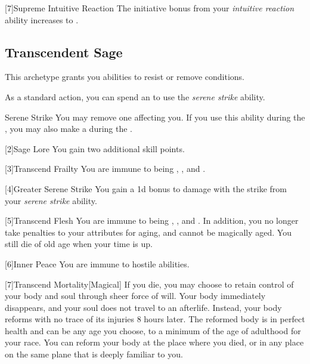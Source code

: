         [7]{Supreme Intuitive Reaction}
        The initiative bonus from your \textit{intuitive reaction} ability increases to .

    \subsection{Transcendent Sage}
        This archetype grants you abilities to resist or remove conditions.

         As a standard action, you can spend an  to use the \textit{serene strike} ability.
        \begin{ability}{Serene Strike}
            You may remove one  affecting you.
            If you use this ability during the , you may also make a  during the .
        \end{ability}

        [2]{Sage Lore} You gain two additional skill points.

        [3]{Transcend Frailty}
        You are immune to being , , and .

        [4]{Greater Serene Strike} You gain a \plus1d bonus to damage with the strike from your \textit{serene strike} ability.

        [5]{Transcend Flesh}
        You are immune to being , , and .
        In addition, you no longer take penalties to your attributes for aging, and cannot be magically aged.
        You still die of old age when your time is up.

        [6]{Inner Peace}
        You are immune to hostile  abilities.

        [7]{Transcend Mortality}[Magical]
        If you die, you may choose to retain control of your body and soul through sheer force of will.
        Your body immediately disappears, and your soul does not travel to an afterlife.
        Instead, your body reforms with no trace of its injuries 8 hours later.
        The reformed body is in perfect health and can be any age you choose, to a minimum of the age of adulthood for your race.
        You can reform your body at the place where you died, or in any place on the same plane that is deeply familiar to you.

